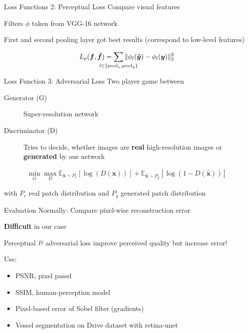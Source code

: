 \documentclass{beamer}
\newcommand{\img}{\bm{f}} %
\begin{document}
\begin{frame}{Loss Functions 2: Perceptual Loss}
  Compare visual features

  Filters $\phi$ taken from VGG-16 network

  First and second pooling layer got best results (correspond to low-level features)
 
\begin{equation}
  \label{eq:perceptual-loss}
  L_p(\img, \hat{\img}) = \sum_{\mathclap{l \in \{ \text{pool}_1, \text{pool}_2 \}}} \Vert \phi_l( \bm{\hat{y}} ) - \phi_l (\bm{y}) \Vert_2^2
\end{equation}
\end{frame}

\begin{frame}{Loss Function 3: Adversarial Loss}
  Two player game between
  \begin{description}
  \item[Generator (G)] Super-resolution network
  \item[Discriminator (D)] Tries to decide, whether images are \textbf{real} high-resolution images or \textbf{generated} by our network
  \end{description}

\begin{align}
 \min_G \max_D \mathbb{E}_{\bm{x} \sim P_r} \left[ \log (D({\bm{x}})) \right] +
  \mathbb{E}_{\hat{\bm{x}} \sim P_g} \left[  \log (1 - D(\hat{\bm{x}})) \right]
\end{align}

with $P_r$ real patch distribution and $P_g$ generated patch distribution
\end{frame}

\begin{frame}{Evaluation}
  Normally: Compare pixel-wise reconstruction error

  \textbf{Difficult} in our case

  Perceptual \textit{\&} adversarial loss improve perceived quality but increase error!

  Use:
  \begin{itemize}
  \item PSNR, pixel pased
  \item SSIM, human-perception model
  \item Pixel-based error of Sobel filter (gradients)
  \item Vessel segmentation on Drive dataset with retina-unet
  \end{itemize}
\end{frame}
\end{document}
